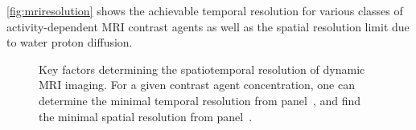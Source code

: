 \autoref{fig:mriresolution} shows the achievable temporal resolution for various classes of activity-dependent MRI contrast agents as well as the spatial resolution limit due to water proton diffusion.

\begin{figure}[htbp]
\caption{Key factors determining the spatiotemporal resolution of dynamic MRI imaging. For a given contrast agent concentration, one can determine the minimal temporal resolution from panel~\protect{}, and find the minimal spatial resolution from panel~\protect{}.}
\label{fig:mriresolution}
\centering
{}
\hspace{1mm}
\end{figure}

